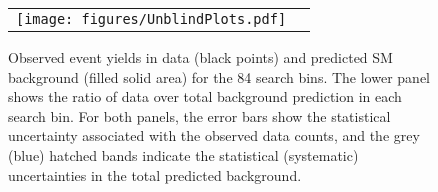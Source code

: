 \begin{figure}[p]
  \begin{center}
  \begin{tabular}{cc}
  \texttt{[image: figures/UnblindPlots.pdf]}
  \end{tabular}
  \caption{Observed event yields in data (black points) and predicted SM background (filled solid area) for the 84 search bins.
  The lower panel shows the ratio of data over total background prediction in each search bin.
  For both panels, the error bars show the statistical uncertainty associated with the observed data counts,
  and the grey (blue) hatched bands indicate the statistical (systematic) uncertainties in the total predicted background.}
  \label{fig:baseline_SR}
  \end{center}
\end{figure}

